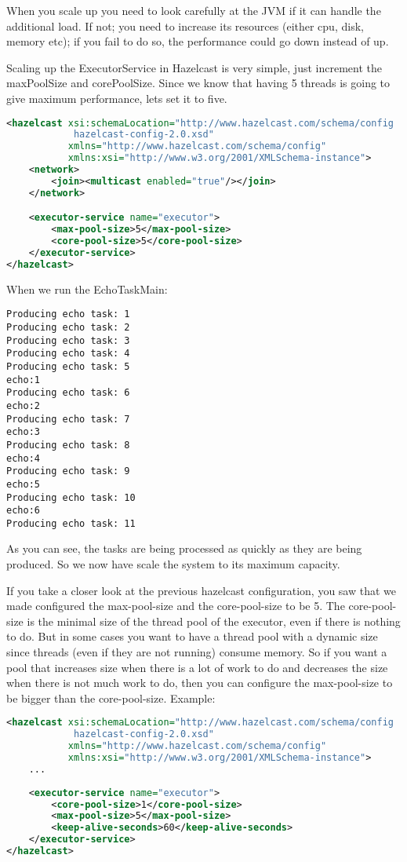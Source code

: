 When you scale up you need to look carefully at the JVM if it can handle the additional load. If not; you need to increase its resources (either cpu, disk, memory etc); if you fail to do so, the performance could go down instead of up. 

Scaling up the ExecutorService in Hazelcast is very simple, just increment the maxPoolSize and corePoolSize. Since we know that having 5 threads is going to give maximum performance, lets set it to five.
\begin{lstlisting}[language=xml]
<hazelcast xsi:schemaLocation="http://www.hazelcast.com/schema/config
            hazelcast-config-2.0.xsd"
           xmlns="http://www.hazelcast.com/schema/config"
           xmlns:xsi="http://www.w3.org/2001/XMLSchema-instance">
    <network>
        <join><multicast enabled="true"/></join>
    </network>

    <executor-service name="executor">
        <max-pool-size>5</max-pool-size>
        <core-pool-size>5</core-pool-size>
    </executor-service>
</hazelcast>
\end{lstlisting}

When we run the EchoTaskMain:
\begin{verbatim}
Producing echo task: 1
Producing echo task: 2
Producing echo task: 3
Producing echo task: 4
Producing echo task: 5
echo:1
Producing echo task: 6
echo:2
Producing echo task: 7
echo:3
Producing echo task: 8
echo:4
Producing echo task: 9
echo:5
Producing echo task: 10
echo:6
Producing echo task: 11	
\end{verbatim}
As you can see, the tasks are being processed as quickly as they are being produced. So we now have scale the system to its maximum capacity. 

If you take a closer look at the previous hazelcast configuration, you saw that we made configured the max-pool-size and the core-pool-size to be 5. The core-pool-size is the minimal size of the thread pool of the executor, even if there is nothing to do. But in some cases you want to have a thread pool with a dynamic size since threads (even if they are not running) consume memory. So if you want a pool that increases size when there is a lot of work to do and decreases the size when there is not much work to do, then you can configure the max-pool-size to be bigger than the core-pool-size. Example:

\begin{lstlisting}[language=xml]
<hazelcast xsi:schemaLocation="http://www.hazelcast.com/schema/config
            hazelcast-config-2.0.xsd"
           xmlns="http://www.hazelcast.com/schema/config"
           xmlns:xsi="http://www.w3.org/2001/XMLSchema-instance">
    ...
    
    <executor-service name="executor">
        <core-pool-size>1</core-pool-size> 
        <max-pool-size>5</max-pool-size>
        <keep-alive-seconds>60</keep-alive-seconds>
    </executor-service>
</hazelcast>
\end{lstlisting}

